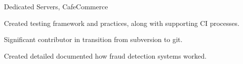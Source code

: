 \item {} Dedicated Servers, CafeCommerce

\item {} Created testing framework and practices, along with supporting CI processes. %
\item {} Significant contributor in transition from subversion to git.
\item {} Created detailed documented how fraud detection systems worked.

